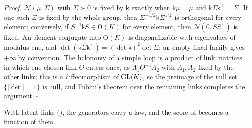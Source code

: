 \noindent\emph{Proof.}
$\mathcal N(\mu,\Sigma)$ with $\Sigma\succ0$ is fixed by $\mathsf k$ exactly when $\mathsf k\mu=\mu$ and
$\mathsf k\Sigma\mathsf k^\top=\Sigma$. If one such $\Sigma$ is fixed by the whole group, then
$\Sigma^{-1/2}\mathsf k\Sigma^{1/2}$ is orthogonal for every element; conversely, if
$S^{-1}\mathsf kS\in\mathrm O(K)$ for every element, then $\mathcal N(0,SS^\top)$ is fixed. An element
conjugate into $\mathrm O(K)$ is diagonalizable with eigenvalues of modulus one, and
$\det(\mathsf k\Sigma\mathsf k^\top)=(\det\mathsf k)^2\det\Sigma$; an empty fixed family gives $+\infty$ by
convention. The holonomy of a simple loop is a product of link matrices in which one chosen link $\Theta$
enters once, as $A_1\Theta^{\pm1}A_2$ with $A_1,A_2$ fixed by the other links; this is a diffeomorphism of
$\mathrm{GL}(K)$, so the preimage of the null set $\{\lvert\det\rvert=1\}$ is null, and Fubini's theorem over the
remaining links completes the argument. $\square$

With latent links (), the generators carry a law, and the score of
 becomes a function of them.

